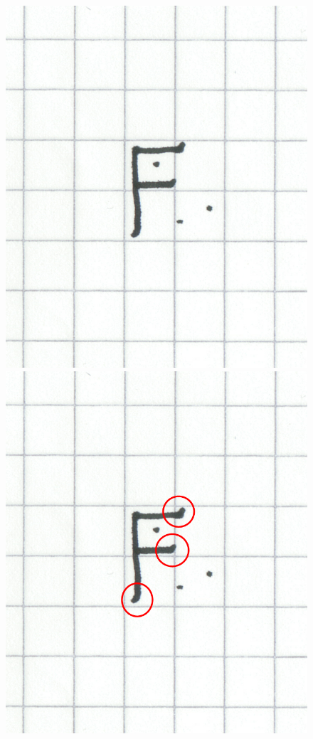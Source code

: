 \begin{figure}[htbp]
   \begin{center}
 \includegraphics[scale=1.5]{images/Foriginal.png}
 \includegraphics[scale=1.5]{images/F1hooks.png}

\end{center}
\end{figure}
